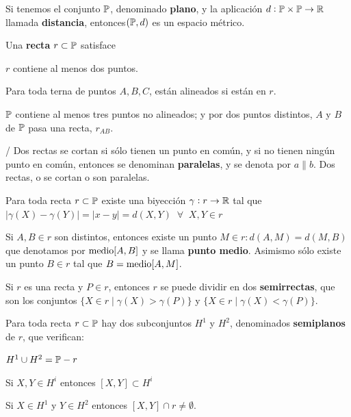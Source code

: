 	 Si tenemos el conjunto $\P$, denominado \textbf{plano}, y la aplicación $d:\P \times \P \rightarrow \R$ llamada \textbf{distancia}, entonces$(\P, d)$ es un espacio métrico.

 Una \textbf{recta} $r \subset \P$ satisface
\begin{itemizex}
	\item $r$ contiene al menos dos puntos.
	\item Para toda terna de puntos $A, B, C$, están alineados si están en $r$.
\end{itemizex}

 $\P$ contiene al menos tres puntos no alineados; y por dos puntos distintos, $A$ y $B$ de $\P$ pasa una recta, $r_{AB}$.

 /  Dos rectas se cortan si sólo tienen un punto en común, y si no tienen ningún punto en común, entonces se denominan \textbf{paralelas}, y se denota por $a \parallel b$. Dos rectas, o se cortan o son paralelas.

\importante{} Para toda recta $r \subset \P$ existe una biyección $\gamma: r \rightarrow \R$ tal que $|\gamma(X) - \gamma(Y)| = |x - y| = d(X, Y) \;\; \forall \;\; X,Y \in r$ 

 Si $A, B \in r$ son distintos, entonces existe un punto $M\in r: d(A,M) = d(M,B)$ que denotamos por $\m[A,B]$ y se llama \textbf{punto medio}. Asimismo sólo existe un punto $B \in r$ tal que $B = \m[A, M]$.

\obligatorio {}

 Si $r$ es una recta y $P \in r$, entonces $r$ se puede dividir en dos \textbf{semirrectas}, que son los conjuntos $\{X \in r \; | \; \gamma(X) > \gamma(P)\}$ y $\{X \in r \; | \; \gamma(X) < \gamma(P)\}$.

 Para toda recta $r \subset \P$ hay dos subconjuntos $H^1$ y $H^2$, denominados \textbf{semiplanos} de $r$, que verifican:
\begin{itemizex}
	\item $H^1 \cup H^2 = \P-r$
	\item Si $X,Y \in H^i$ entonces $[X,Y] \subset H^i$
	\item Si $X \in H^1$ y $Y \in H^2$ entonces $[X,Y] \cap r \neq \emptyset$.
\end{itemizex}

